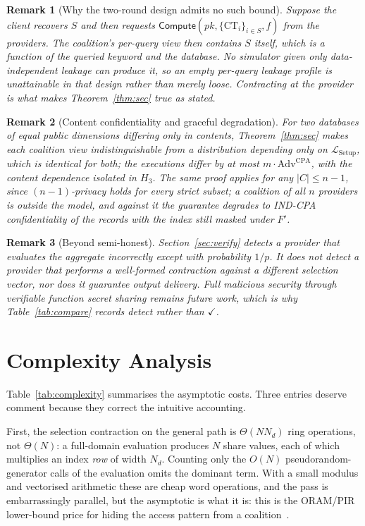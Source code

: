 \documentclass[journal]{IEEEtran}
\newtheorem{remark}{Remark}
\newcommand{\Leak}{\mathcal{L}}
\newcommand{\Compute}{\mathsf{Compute}}
\begin{document}
\begin{remark}[Why the two-round design admits no such bound]
\label{rem:v1}
Suppose the client recovers $S$ and then requests $\Compute(pk,\{\text{CT}_i\}_{i\in S},f)$ from the providers. The coalition's per-query view then contains $S$ itself, which is a function of the queried keyword and the database. No simulator given only data-independent leakage can produce it, so an empty per-query leakage profile is \emph{unattainable} in that design rather than merely loose. Contracting at the provider is what makes Theorem~\ref{thm:sec} true as stated.
\end{remark}

\begin{remark}[Content confidentiality and graceful degradation]
For two databases of equal public dimensions differing only in contents, Theorem~\ref{thm:sec} makes each coalition view indistinguishable from a distribution depending only on $\Leak_{\mathrm{Setup}}$, which is identical for both; the executions differ by at most $m\cdot\mathrm{Adv}^{\mathrm{CPA}}$, with the content dependence isolated in $H_3$. The same proof applies for any $|C|\le n-1$, since $(n{-}1)$-privacy holds for every strict subset; a coalition of all $n$ providers is outside the model, and against it the guarantee degrades to IND-CPA confidentiality of the records with the index still masked under $F'$.
\end{remark}

\begin{remark}[Beyond semi-honest]
Section~\ref{sec:verify} detects a provider that evaluates the aggregate incorrectly except with probability $1/p$. It does not detect a provider that performs a well-formed contraction against a different selection vector, nor does it guarantee output delivery. Full malicious security through verifiable function secret sharing remains future work, which is why Table~\ref{tab:compare} records \emph{detect} rather than $\checkmark$.
\end{remark}

\section{Complexity Analysis}
\label{sec:complexity}
Table~\ref{tab:complexity} summarises the asymptotic costs. Three entries deserve comment because they correct the intuitive accounting.

First, the selection contraction on the general path is $\Theta(N N_d)$ ring operations, not $\Theta(N)$: a full-domain evaluation produces $N$ share values, each of which multiplies an index \emph{row} of width $N_d$. Counting only the $O(N)$ pseudorandom-generator calls of the evaluation omits the dominant term. With a small modulus and vectorised arithmetic these are cheap word operations, and the pass is embarrassingly parallel, but the asymptotic is what it is: this is the ORAM/PIR lower-bound price for hiding the access pattern from a coalition~\cite{goldreich1996software}.
\end{document}
